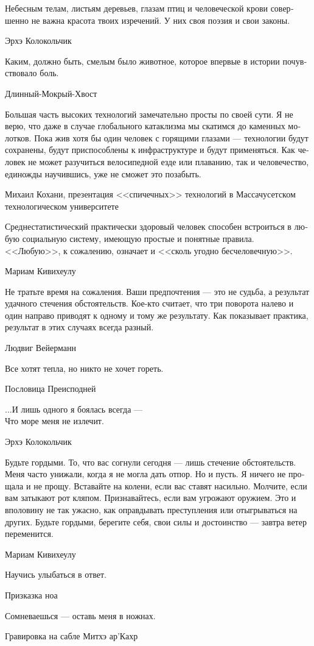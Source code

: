 \documentclass[a4paper,12pt,fleqn]{book}\usepackage{polyglossia}\setdefaultlanguage[babelshorthands=true]{russian}\setotherlanguage{english}\defaultfontfeatures{Ligatures=TeX,Mapping=tex-text}\usepackage{xcolor}\newcommand{\ml}[3]{#2}
\begin{document}
{\epigraph
{Небесным телам, листьям деревьев, глазам птиц и человеческой крови совершенно не важна красота твоих изречений.
У них своя поэзия и свои законы.}
{Эрхэ Колокольчик}

\epigraph
{Каким, должно быть, смелым было животное, которое впервые в истории почувствовало боль.}
{Длинный-Мокрый-Хвост}

\epigraph
{Большая часть высоких технологий замечательно просты по своей сути.
Я не верю, что даже в случае глобального катаклизма мы скатимся до каменных молотков.
Пока жив хотя бы один человек с горящими глазами --- технологии будут сохранены, будут приспособлены к инфраструктуре и будут применяться.
Как человек не может разучиться велосипедной езде или плаванию, так и человечество, единожды научившись, уже не сможет это позабыть.}
{Михаил Кохани, презентация <<спичечных>> технологий в Массачусетском технологическом университете}

\epigraph
{Среднестатистический практически здоровый человек способен встроиться в любую социальную систему, имеющую простые и понятные правила.
<<Любую>>, к сожалению, означает и <<сколь угодно бесчеловечную>>.}
{Мариам Кивихеулу}

\epigraph
{Не тратьте время на сожаления.
Ваши предпочтения --- это не судьба, а результат удачного стечения обстоятельств.
Кое-кто считает, что три поворота налево и один направо приводят к одному и тому же результату.
Как показывает практика, результат в этих случаях всегда разный.}
{Людвиг Вейерманн}

\epigraph
{Все хотят тепла, но никто не хочет гореть.}
{Пословица Преисподней}

\epigraph
{...И лишь одного я боялась всегда ---\\
Что море меня не излечит.}
{Эрхэ Колокольчик}

\epigraph
{Будьте гордыми.
То, что вас согнули сегодня --- лишь стечение обстоятельств.
Меня часто унижали, когда я не могла дать отпор.
Но и пусть.
Я ничего не прощала и не прощу.
Вставайте на колени, если вас ставят насильно.
Молчите, если вам затыкают рот кляпом.
Признавайтесь, если вам угрожают оружием.
Это и вполовину не так ужасно, как оправдывать преступления или отыгрываться на других.
Будьте гордыми, берегите себя, свои силы и достоинство --- завтра ветер переменится.}
{Мариам Кивихеулу}

\epigraph{
\ml{$0$}
{Научись улыбаться в ответ.}
{Learn to smile back.}
}{Призказка ноа}

\epigraph
{\ml{$0$}
{Сомневаешься --- оставь меня в ножнах.}
{If in doubt, keep me untouched.}}
{Гравировка на сабле Митхэ ар'Кахр}

}
\end{document}
